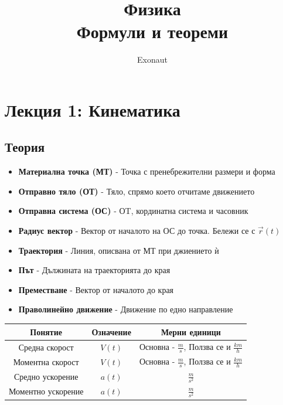 \documentclass[fleqn, 12pt]{article}
\title{Физика \\ Формули и теореми}
\author{Exonaut}
\theoremstyle{definition}
\begin{document}
\maketitle
{}
\newpage
{}

\tableofcontents

\newpage
\section{Лекция 1: Кинематика}

\subsection{Теория}

\begin{itemize}
\item \textbf{Материална точка (МТ)} - Точка с пренебрежителни размери и форма
\item \textbf{Отправно тяло (ОТ)} - Тяло, спрямо което отчитаме движението 
\item \textbf{Отправна система (ОС)} - ОT, кординатна система и часовник
\item \textbf{Радиус вектор} - Вектор от началото на ОС до точка. Бележи се с $\vec{r}(t)$
\item \textbf{Траектория} - Линия, описвана от МТ при джиението ѝ 
\item \textbf{Път} - Дължината на траекторията до края 
\item \textbf{Преместване} - Вектор от началото до края 
\item \textbf{Праволинейно движение} - Движение по едно направление
\end{itemize}

\begin{center}
\begin{tabular}{ |c|c|c|}
\hline
\textbf{Понятие} &\textbf{Означение} & \textbf{Мерни единици}\\
\hline
Средна скорост & $V(t)$ & Основна - $\frac{m}{s}$, Ползва се и $\frac{km}{h}$\\
\hline
Моментна скорост & $V(t)$ & Основна - $\frac{m}{s}$, Ползва се и $\frac{km}{h}$\\
\hline
Средно ускорение & $a(t)$ & $\frac{m}{s^2}$\\
\hline
Моментно ускорение & $a(t)$ & $\frac{m}{s^2}$\\
\hline
\end{tabular}
\end{center}
\end{document}
